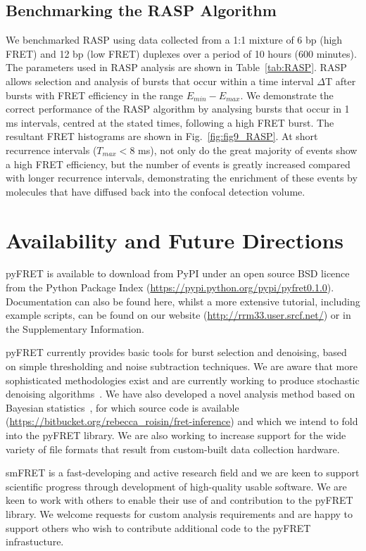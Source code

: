 \documentclass[10pt]{article}
\begin{document}
\subsection*{Benchmarking the RASP Algorithm}    
We benchmarked RASP using data collected from a 1:1 mixture of 6 bp (high FRET) and 12 bp (low FRET) duplexes over a period of 10 hours (600 minutes). The parameters used in RASP analysis are shown in Table~\ref{tab:RASP}. RASP allows selection and analysis of bursts that occur within a time interval $\Delta$T after bursts with FRET efficiency in the range $E_{min} - E_{max}$. We demonstrate the correct performance of the RASP algorithm by analysing bursts that occur in 1 ms intervals, centred at the stated times, following a high FRET burst. The resultant FRET histograms are shown in Fig.~\ref{fig:fig9_RASP}. At short recurrence intervals ($T_{max} < 8$ ms), not only do the great majority of events show a high FRET efficiency, but the number of events is greatly increased compared with longer recurrence intervals, demonstrating the enrichment of these events by molecules that have diffused back into the confocal detection volume. 
 
\section*{Availability and Future Directions}
pyFRET is available to download from PyPI under an open source BSD licence from the Python Package Index (\url{https://pypi.python.org/pypi/pyfret0.1.0}). Documentation can also be found here, whilst a more extensive tutorial, including example scripts, can be found on our website (\url{http://rrm33.user.srcf.net/}) or in the Supplementary Information.

pyFRET currently provides basic tools for burst selection and denoising, based on simple thresholding and noise subtraction techniques. We are aware that more sophisticated methodologies exist and are currently working to produce stochastic denoising algorithms~\cite{kudryavtsev2012}. We have also developed a novel analysis method based on Bayesian statistics~\cite{murphy14}, for which source code is available (\url{https://bitbucket.org/rebecca_roisin/fret-inference}) and which we intend to fold into the pyFRET library. We are also working to increase support for the wide variety of file formats that result from custom-built data collection hardware. 

smFRET is a fast-developing and active research field and we are keen to support scientific progress through development of high-quality usable software. We are keen to work with others to enable their use of and contribution to the pyFRET library. We welcome requests for custom analysis requirements and are happy to support others who wish to contribute additional code to the pyFRET infrastucture. 
\end{document}
